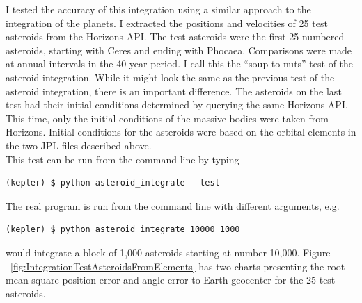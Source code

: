 I tested the accuracy of this integration using a similar approach to the integration of the planets.
I extracted the positions and velocities of 25 test asteroids from the Horizons API.
The test asteroids were the first 25 numbered asteroids, starting with Ceres and ending with Phocaea.
Comparisons were made at annual intervals in the 40 year period.
I call this the ``soup to nuts'' test of the asteroid integration.
While it might look the same as the previous test of the asteroid integration, there is an important difference.
The asteroids on the last test had their initial conditions determined by querying the same Horizons API.
This time, only the initial conditions of the massive bodies were taken from Horizons.
Initial conditions for the asteroids were based on the orbital elements in the two JPL files described above.\\
This test can be run from the command line by typing
\begin{lstlisting}[style=CodeSnippet]
(kepler) $ python asteroid_integrate --test
\end{lstlisting}
The real program is run from the command line with different arguments, e.g. 
\begin{lstlisting}[style=CodeSnippet]
(kepler) $ python asteroid_integrate 10000 1000
\end{lstlisting}
would integrate a block of 1,000 asteroids starting at number 10,000. 
Figure ~\ref{fig:IntegrationTestAsteroidsFromElements} has two charts
presenting the root mean square position error and angle error to Earth geocenter for the 25 test asteroids.
